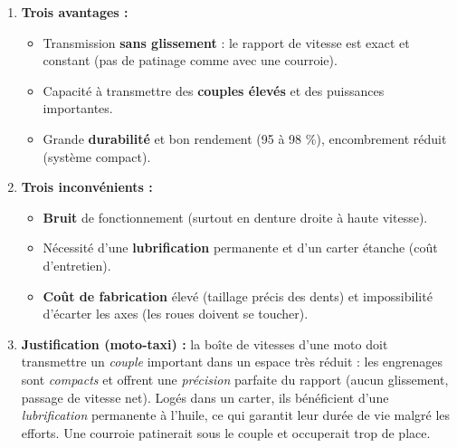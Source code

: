 \documentclass[11pt]{article}
\newcounter{popsec}
\newcounter{popsub}
\newcommand{\courssub}[1]{%
  \stepcounter{popsub}%
  \par\vspace{9pt}\noindent{\popxbold\fontsize{11.5}{13}\selectfont\color{popink}{\color{poporange}\thepopsec.\thepopsub}\hspace{6pt}#1}\par\nopagebreak\vspace{4pt}
}
\begin{document}
\begin{corrige}
\begin{enumerate}
    \item \textbf{Trois avantages :}
    \begin{itemize}
        \item Transmission \textbf{sans glissement} : le rapport de vitesse est exact et constant (pas de patinage comme avec une courroie).
        \item Capacité à transmettre des \textbf{couples élevés} et des puissances importantes.
        \item Grande \textbf{durabilité} et bon rendement (95 à 98 \%), encombrement réduit (système compact).
    \end{itemize}
    \item \textbf{Trois inconvénients :}
    \begin{itemize}
        \item \textbf{Bruit} de fonctionnement (surtout en denture droite à haute vitesse).
        \item Nécessité d'une \textbf{lubrification} permanente et d'un carter étanche (coût d'entretien).
        \item \textbf{Coût de fabrication} élevé (taillage précis des dents) et impossibilité d'écarter les axes (les roues doivent se toucher).
    \end{itemize}
    \item \textbf{Justification (moto-taxi) :} la boîte de vitesses d'une moto doit transmettre un \emph{couple} important dans un espace très réduit : les engrenages sont \emph{compacts} et offrent une \emph{précision} parfaite du rapport (aucun glissement, passage de vitesse net). Logés dans un carter, ils bénéficient d'une \emph{lubrification} permanente à l'huile, ce qui garantit leur durée de vie malgré les efforts. Une courroie patinerait sous le couple et occuperait trop de place.
\end{enumerate}
\end{corrige}

\courssub{Je me prépare au Bac}
\end{document}
